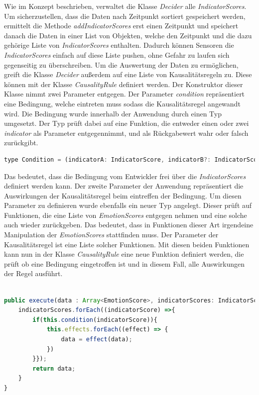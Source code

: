 Wie im Konzept beschrieben, verwaltet die Klasse \textit{Decider} alle \textit{IndicatorScores}. Um sicherzustellen, dass die Daten nach Zeitpunkt sortiert gespeichert werden, ermittelt die Methode \textit{addIndicatorScores} erst einen Zeitpunkt und speichert danach die Daten in einer List von Objekten, welche den Zeitpunkt und die dazu gehörige Liste von \textit{IndicatorScores} enthalten. Dadurch können Sensoren die \textit{IndicatorScores} einfach auf diese Liste pushen, ohne Gefahr zu laufen sich gegenseitig zu überschreiben.\newline
Um die Auswertung der Daten zu ermöglichen, greift die Klasse \textit{Decider} außerdem auf eine Liste von Kausalitätsregeln zu. Diese können mit der Klasse \textit{CausalityRule} definiert werden.
Der Konstruktor dieser Klasse nimmt zwei Parameter entgegen. Der Parameter \textit{condition} repräsentiert eine Bedingung, welche eintreten muss sodass die Kausalitätsregel angewandt wird. Die Bedingung wurde innerhalb der Anwendung durch einen Typ umgesetzt. Der Typ prüft dabei auf eine Funktion, die entweder einen oder zwei \textit{indicator} als Parameter entgegennimmt, und als Rückgabewert wahr oder falsch zurückgibt. 
\begin{lstlisting}[caption={Typ condition}, language=JavaScript]
	type Condition = (indicatorA: IndicatorScore, indicatorB?: IndicatorScore) => boolean;
\end{lstlisting}
Das bedeutet, dass die Bedingung vom Entwickler frei über die \textit{IndicatorScores} definiert werden kann. Der zweite Parameter der Anwendung repräsentiert die Auswirkungen der Kausalitätsregel beim eintreffen der Bedingung. Um diesen Parameter zu definieren wurde ebenfalls ein neuer Typ angelegt. Dieser prüft auf Funktionen, die eine Liste von \textit{EmotionScores} entgegen nehmen und eine solche auch wieder zurückgeben. Das bedeutet, dass in Funktionen dieser Art irgendeine Manipulation der \textit{EmotionScores} stattfinden muss. Der Parameter der Kausalitätsregel ist eine Liste solcher Funktionen. Mit diesen beiden Funktionen kann nun in der Klasse \textit{CausalityRule} eine neue Funktion definiert werden, die prüft ob eine Bedingung eingetroffen ist und in diesem Fall, alle Auswirkungen der Regel ausführt. 
\begin{lstlisting}[caption={execute Funktion der Klasse CausalityRule},language=JavaScript]

public execute(data : Array<EmotionScore>, indicatorScores: IndicatorScore[]) {
	indicatorScores.forEach((indicatorScore) =>{
		if(this.condition(indicatorScore)){
			this.effects.forEach((effect) => {
				data = effect(data);
			})
		}});
		return data;
	}
}

\end{lstlisting}
